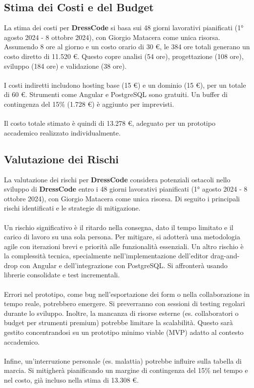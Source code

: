 \documentclass[11pt]{article}
\begin{document}
\subsection{Stima dei Costi e del Budget}
La stima dei costi per \textbf{DressCode} si basa sui 48 giorni lavorativi pianificati (1° agosto 2024 - 8 ottobre 2024), con Giorgio Matacera come unica risorsa. Assumendo 8 ore al giorno e un costo orario di 30 €, le 384 ore totali generano un costo diretto di 11.520 €. Questo copre analisi (54 ore), progettazione (108 ore), sviluppo (184 ore) e validazione (38 ore).
\\\\
I costi indiretti includono hosting base (15 €) e un dominio (15 €), per un totale di 60 €. Strumenti come Angular e PostgreSQL sono gratuiti. Un buffer di contingenza del 15\% (1.728 €) è aggiunto per imprevisti.
\\\\
Il costo totale stimato è quindi di 13.278 €, adeguato per un prototipo accademico realizzato individualmente.

\subsection{Valutazione dei Rischi}
La valutazione dei rischi per \textbf{DressCode} considera potenziali ostacoli nello sviluppo di \textbf{DressCode} entro i 48 giorni lavorativi pianificati (1° agosto 2024 - 8 ottobre 2024), con Giorgio Matacera come unica risorsa. Di seguito i principali rischi identificati e le strategie di mitigazione.
\\\\
Un rischio significativo è il ritardo nella consegna, dato il tempo limitato e il carico di lavoro su una sola persona. Per mitigare, si adotterà una metodologia agile con iterazioni brevi e priorità alle funzionalità essenziali. Un altro rischio è la complessità tecnica, specialmente nell'implementazione dell'editor drag-and-drop con Angular e dell'integrazione con PostgreSQL. Si affronterà usando librerie consolidate e test incrementali.
\\\\
Errori nel prototipo, come bug nell'esportazione dei form o nella collaborazione in tempo reale, potrebbero emergere. Si preverranno con sessioni di testing regolari durante lo sviluppo. Inoltre, la mancanza di risorse esterne (es. collaboratori o budget per strumenti premium) potrebbe limitare la scalabilità. Questo sarà gestito concentrandosi su un prototipo minimo viable (MVP) adatto al contesto accademico.
\\\\
Infine, un'interruzione personale (es. malattia) potrebbe influire sulla tabella di marcia. Si mitigherà pianificando un margine di contingenza del 15\% nel tempo e nel costo, già incluso nella stima di 13.308 €.
\end{document}
